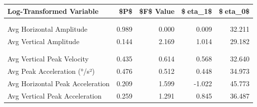 \begin{table}
\centering
\begin{tabular}[t]{lrrrr}
\toprule
Log-Transformed Variable & \$P\$ & \$F\$ Value & \$eta\_1\$ & \$eta\_0\$\\
\midrule
\cellcolor{gray!10}{Saccade Frequency (Hz)} & \cellcolor{gray!10}{0.759} & \cellcolor{gray!10}{0.095} & \cellcolor{gray!10}{-0.211} & \cellcolor{gray!10}{49.005}\\
\cellcolor{gray!10}{Avg Amplitude (°)} & \cellcolor{gray!10}{0.539} & \cellcolor{gray!10}{0.380} & \cellcolor{gray!10}{0.335} & \cellcolor{gray!10}{23.682}\\
Avg Horizontal Amplitude & 0.989 & 0.000 & 0.009 & 32.211\\
Avg Vertical Amplitude & 0.144 & 2.169 & 1.014 & 29.182\\
\cellcolor{gray!10}{Avg Peak Velocity (°/s)} & \cellcolor{gray!10}{0.432} & \cellcolor{gray!10}{0.623} & \cellcolor{gray!10}{-0.461} & \cellcolor{gray!10}{30.303}\\
\addlinespace
\cellcolor{gray!10}{Avg Horizontal Peak Velocity} & \cellcolor{gray!10}{0.420} & \cellcolor{gray!10}{0.656} & \cellcolor{gray!10}{-0.485} & \cellcolor{gray!10}{34.474}\\
Avg Vertical Peak Velocity & 0.435 & 0.614 & 0.568 & 32.640\\
Avg Peak Acceleration (°/s²) & 0.476 & 0.512 & 0.448 & 34.973\\
Avg Horizontal Peak Acceleration & 0.209 & 1.599 & -1.022 & 45.773\\
Avg Vertical Peak Acceleration & 0.259 & 1.291 & 0.845 & 36.487\\
\bottomrule
\end{tabular}
\end{table}
